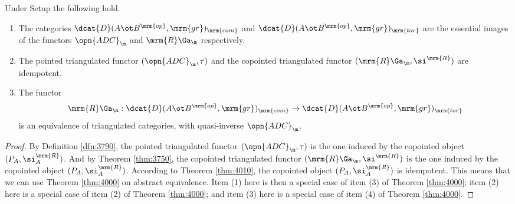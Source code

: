 \begin{thm} \label{thm:3792} 
Under Setup \tup{\ref{setup:3900}} the following hold.
\begin{enumerate}
\item The categories  
$\dcat{D}(A \ot B^{\mrm{op}}, \mrm{gr})_{\mrm{com}}$ and 
$\dcat{D}(A \ot B^{\mrm{op}}, \mrm{gr})_{\mrm{tor}}$
are the essential images of the functors $\opn{ADC}_{\m}$ and 
$\mrm{R} \Ga_{\m}$ respectively.  

\item The pointed triangulated functor
$(\opn{ADC}_{\m}, \tau)$ and the copointed triangulated functor
$(\mrm{R} \Ga_{\m}, \si^{\mrm{R}})$ are idempotent. 

\item The functor 
\[ \mrm{R} \Ga_{\m} : \dcat{D}(A \ot B^{\mrm{op}}, \mrm{gr})_{\mrm{com}} \to 
\dcat{D}(A \ot B^{\mrm{op}}, \mrm{gr})_{\mrm{tor}} \]
is an equivalence of triangulated categories, with quasi-inverse 
$\opn{ADC}_{\m}$.
\end{enumerate}
\end{thm}

\begin{proof}
By Definition \ref{dfn:3790}, the pointed triangulated functor 
$(\opn{ADC}_{\m}, \tau)$
is the one induced by the copointed object $(P_A, \si^{\mrm{R}}_{A})$.
And by Theorem \ref{thm:3750}, the copointed triangulated functor 
$(\mrm{R} \Ga_{\m}, \si^{\mrm{R}})$
is the one induced by the copointed object $(P_A, \si^{\mrm{R}}_{A})$.
According to Theorem \ref{thm:4010}, the copointed object 
$(P_A, \si^{\mrm{R}}_{A})$ is idempotent.
This means that we can use Theorem \ref{thm:4000}  on abstract equivalence. 
Item (1) here is then a special case of item (3) of Theorem \ref{thm:4000};
item (2) here is a special case of item (2) of Theorem \ref{thm:4000};
and item (3) here is a special case of item (4) of Theorem \ref{thm:4000}.
\end{proof}

